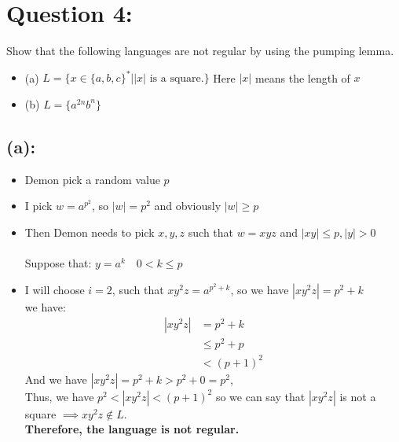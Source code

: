 \documentclass [9 pt]{article}
\theoremstyle{definition}
\begin{document}
\newpage
\section*{Question 4:}
Show that the following languages are not regular by using the pumping lemma.
\begin{itemize}
	\item(a) $L = \{x \in \{a, b, c\}^*||x| \text{ is a square.} \}$ Here $|x|$ means the length of $x$
	\item(b) $L = \{a^{2n}b^n\}$
\end{itemize}

\subsection*{(a):}
\begin{itemize}
	\item Demon pick a random value $p$
	\item I pick $w = a^{p^2}$, so $|w| = p^2$ and obviously $|w| \geq p$ 
	\item Then Demon needs to pick $x, y, z$ such that $w = xyz$ and $|xy| \leq p, |y| > 0 $ \\\\
	 Suppose that: $ y = a^k \quad 0 <  k \leq p$\\
	\item I will choose $i = 2$, such that $ xy^2z = a^{p^2 + k} $, so we have $|xy^2z | = p^2 + k$\\
	we have:
	\begin{align*}
		|xy^2z | &= p^2 + k \\
		& \leq p^2 + p \\
		&< (p+1)^2
	\end{align*}
	And we have $|xy^2z | = p^2 + k > p^2 + 0 = p^2$, \\
	Thus, we have $ p^2 < |xy^2z | < (p+1)^2 $ so we can say that $|xy^2z |$ is not a square $\implies xy^2z \notin L$.\\
	\newline
		\textbf{ Therefore, the language is not regular. }
\end{itemize}
\end{document}
